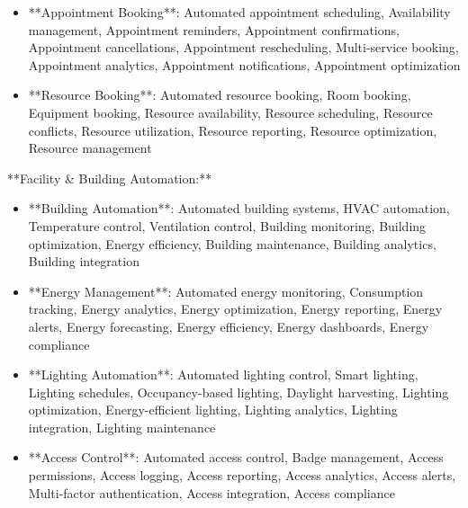 \documentclass[11pt,a4paper]{article}
\begin{document}
\begin{itemize}
\item **Appointment Booking**: Automated appointment scheduling, Availability management, Appointment reminders, Appointment confirmations, Appointment cancellations, Appointment rescheduling, Multi-service booking, Appointment analytics, Appointment notifications, Appointment optimization
\end{itemize}

\begin{itemize}
\item **Resource Booking**: Automated resource booking, Room booking, Equipment booking, Resource availability, Resource scheduling, Resource conflicts, Resource utilization, Resource reporting, Resource optimization, Resource management
\end{itemize}

**Facility \& Building Automation:**

\begin{itemize}
\item **Building Automation**: Automated building systems, HVAC automation, Temperature control, Ventilation control, Building monitoring, Building optimization, Energy efficiency, Building maintenance, Building analytics, Building integration
\end{itemize}

\begin{itemize}
\item **Energy Management**: Automated energy monitoring, Consumption tracking, Energy analytics, Energy optimization, Energy reporting, Energy alerts, Energy forecasting, Energy efficiency, Energy dashboards, Energy compliance
\end{itemize}

\begin{itemize}
\item **Lighting Automation**: Automated lighting control, Smart lighting, Lighting schedules, Occupancy-based lighting, Daylight harvesting, Lighting optimization, Energy-efficient lighting, Lighting analytics, Lighting integration, Lighting maintenance
\end{itemize}

\begin{itemize}
\item **Access Control**: Automated access control, Badge management, Access permissions, Access logging, Access reporting, Access analytics, Access alerts, Multi-factor authentication, Access integration, Access compliance
\end{itemize}
\end{document}
